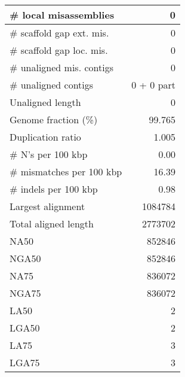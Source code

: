 \documentclass[12pt,a4paper]{article}
\begin{document}
\begin{table}[ht]
\begin{center}
\begin{tabular}{|l*{1}{|r}|}
\# local misassemblies & 0 \\ \hline
\# scaffold gap ext. mis. & 0 \\ \hline
\# scaffold gap loc. mis. & 0 \\ \hline
\# unaligned mis. contigs & 0 \\ \hline
\# unaligned contigs & 0 + 0 part \\ \hline
Unaligned length & 0 \\ \hline
Genome fraction (\%) & 99.765 \\ \hline
Duplication ratio & 1.005 \\ \hline
\# N's per 100 kbp & 0.00 \\ \hline
\# mismatches per 100 kbp & 16.39 \\ \hline
\# indels per 100 kbp & 0.98 \\ \hline
Largest alignment & 1084784 \\ \hline
Total aligned length & 2773702 \\ \hline
NA50 & 852846 \\ \hline
NGA50 & 852846 \\ \hline
NA75 & 836072 \\ \hline
NGA75 & 836072 \\ \hline
LA50 & 2 \\ \hline
LGA50 & 2 \\ \hline
LA75 & 3 \\ \hline
LGA75 & 3 \\ \hline
\end{tabular}
\end{center}
\end{table}
\end{document}
